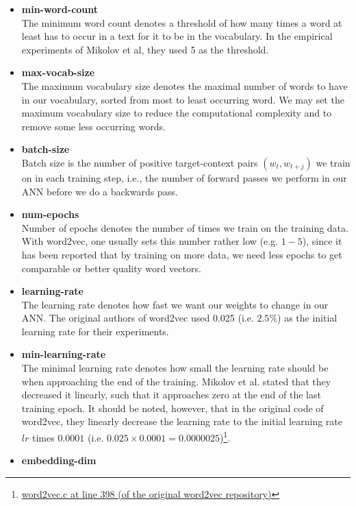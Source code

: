 \begin{itemize}
    \item \textbf{min-word-count} \\
        The minimum word count denotes a threshold of how many times a word at least has to occur in a text for it to be in the vocabulary. In the empirical experiments of Mikolov et al, they used 5 as the threshold.
    \item \textbf{max-vocab-size} \\
        The maximum vocabulary size denotes the maximal number of words to have in our vocabulary, sorted from most to least occurring word. We may set the maximum vocabulary size to reduce the computational complexity and to remove some less occurring words.
    \item \textbf{batch-size} \\
        Batch size is the number of positive target-context pairs $(w_t, w_{t+j})$ we train on in each training step, i.e., the number of forward passes we perform in our ANN before we do a backwards pass.
    \item \textbf{num-epochs} \\
        Number of epochs denotes the number of times we train on the training data. With word2vec, one usually sets this number rather low (e.g. $1-5$), since it has been reported that by training on more data, we need less epochs to get comparable or better quality word vectors.
    \item \textbf{learning-rate} \\
        The learning rate denotes how fast we want our weights to change in our ANN. The original authors of word2vec used 0.025 (i.e. $2.5\%$) as the initial learning rate for their experiments.
    \item \textbf{min-learning-rate} \\
        The minimal learning rate denotes how small the learning rate should be when approaching the end of the training. Mikolov et al. stated that they decreased it linearly, such that it approaches zero at the end of the last training epoch. It should be noted, however, that in the original code of word2vec, they linearly decrease the learning rate to the initial learning rate $lr$ times $0.0001$ (i.e. $0.025 \times 0.0001 = 0.0000025$)\footnote{\href{https://github.com/tmikolov/word2vec/blob/e092540633572b883e25b367938b0cca2cf3c0e7/word2vec.c\#L398}{word2vec.c at line 398 (of the original word2vec repository)}}.
    \item \textbf{embedding-dim} \\

\end{itemize}
